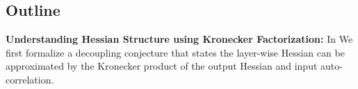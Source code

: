 
\subsection{Outline}

\textbf{Understanding Hessian Structure using Kronecker Factorization:} %
In  We first formalize a decoupling conjecture that states  the layer-wise Hessian can be approximated by the Kronecker product of the output Hessian and input auto-correlation. 

